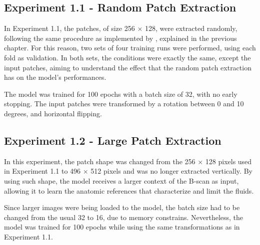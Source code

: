 \subsection{Experiment 1.1 - Random Patch Extraction}
In Experiment 1.1, the patches, of size 256 $\times$ 128, were extracted randomly, following the same procedure as implemented by \textcite{Tennakoon2018}, explained in the previous chapter. For this reason, two sets of four training runs were performed, using each fold as validation. In both sets, the conditions were exactly the same, except the input patches, aiming to understand the effect that the random patch extraction has on the model's performances. 
\par
The model was trained for 100 epochs with a batch size of 32, with no early stopping. The input patches were transformed by a rotation between 0 and 10 degrees, and horizontal flipping. 

\subsection{Experiment 1.2 - Large Patch Extraction}
In this experiment, the patch shape was changed from the 256 $\times$ 128 pixels used in Experiment 1.1 to 496 $\times$ 512 pixels and was no longer extracted vertically. By using such shape, the model receives a larger context of the B-scan as input, allowing it to learn the anatomic references that characterize and limit the fluids.
\par
Since larger images were being loaded to the model, the batch size had to be changed from the usual 32 to 16, due to memory constrains. Nevertheless, the model was trained for 100 epochs while using the same transformations as in Experiment 1.1.

